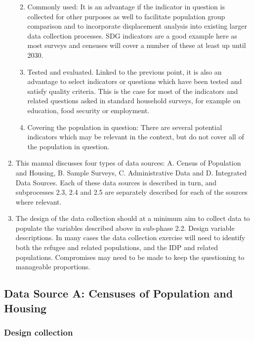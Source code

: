 \documentclass[
]{article}
\begin{document}
\begin{enumerate}
  \begin{enumerate}
  \def\labelenumii{\arabic{enumii}.}
  \setcounter{enumii}{5}
  \item
    Commonly used: It is an advantage if the indicator in question
    is collected for other purposes as well to facilitate population
    group comparison and to incorporate displacement analysis into
    existing larger data collection processes. SDG indicators are a
    good example here as most surveys and censuses will cover a
    number of these at least up until 2030.
  \item
    Tested and evaluated. Linked to the previous point, it is also
    an advantage to select indicators or questions which have been
    tested and satisfy quality criteria. This is the case for most
    of the indicators and related questions asked in standard
    household surveys, for example on education, food security or
    employment.
  \item
    Covering the population in question: There are several potential
    indicators which may be relevant in the context, but do not
    cover all of the population in question.
  \end{enumerate}
\item
  This manual discusses four types of data sources: A. Census of
  Population and Housing, B. Sample Surveys, C. Administrative Data
  and D. Integrated Data Sources. Each of these data sources is
  described in turn, and subprocesses 2.3, 2.4 and 2.5 are separately
  described for each of the sources where relevant.
\item
  The design of the data collection should at a minimum aim to collect
  data to populate the variables described above in sub-phase 2.2.
  Design variable descriptions. In many cases the data collection
  exercise will need to identify both the refugee and related
  populations, and the IDP and related populations. Compromises may
  need to be made to keep the questioning to manageable proportions.
\end{enumerate}

\hypertarget{data-source-a-censuses-of-population-and-housing}{%
\subsection{Data Source A: Censuses of Population and Housing}\label{data-source-a-censuses-of-population-and-housing}}

\hypertarget{design-collection}{%
\subsubsection{Design collection}\label{design-collection}}
\end{document}
